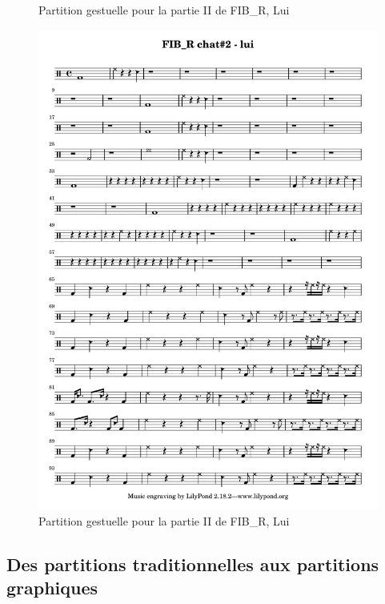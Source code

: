 \begin{figure}[!htbp]
\begin{minipage}[t]{0.48\textwidth}
		\caption{Partition gestuelle pour la partie II de FIB\_R, Lui}
		\label{fig:notation:FIBR-chat2-Elle}
	\end{minipage}
	\hspace{.02\linewidth}
	\begin{minipage}[t]{0.48\textwidth}
	    \includegraphics[width=\linewidth]{gfx/notation/FIBR-Chat2-Lui.pdf}
		\caption{Partition gestuelle pour la partie II de FIB\_R, Lui}
		\label{fig:notation:FIBR-chat2-Lui}
	\end{minipage}
\end{figure}


\subsection{Des partitions traditionnelles aux partitions graphiques}

